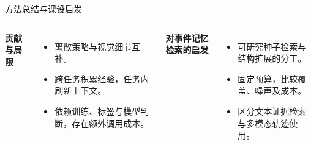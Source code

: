 \begin{frame}{方法总结与课设启发}
    \begin{columns}[T,onlytextwidth]
        \textbf{贡献与局限}\par\vspace{3mm}
        \begin{itemize}\setlength{\itemsep}{3mm}
            \item 离散策略与视觉细节互补。
            \item 跨任务积累经验，任务内刷新上下文。
            \item 依赖训练、标签与模型判断，存在额外调用成本。
        \end{itemize}
        \textbf{对事件记忆检索的启发}\par\vspace{3mm}
        \begin{itemize}\setlength{\itemsep}{3mm}
            \item 可研究种子检索与结构扩展的分工。
            \item 固定预算，比较覆盖、噪声及成本。
            \item 区分文本证据检索与多模态轨迹使用。
        \end{itemize}
    \end{columns}

\end{frame}
